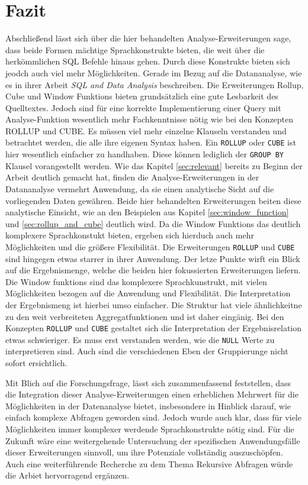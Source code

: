 \chapter{Fazit}
\label{chap:fazit} Abschließend lässt sich über die hier behandelten Analyse-Erweiterungen
sage, dass beide Formen mächtige Sprachkonstrukte bieten, die weit über die herkömmlichen
SQL Befehle hinaus gehen. Durch diese Konstrukte bieten sich jeodch auch viel
mehr Möglichkeiten. Gerade im Bezug auf die Datananalyse, wie es \citet{FOTACHE2015243}
in ihrer Arbeit \textit{SQL and Data Analysis} beschreiben. Die Erweiterungen Rollup,
Cube und Window Funktions bieten grundsätzlich eine gute Lesbarkeit des
Quelltextes. Jedoch sind für eine korrekte Implementierung einer Query mit Analyse-Funktion
wesentlich mehr Fachkenntnisse nötig wie bei den Konzepten ROLLUP und CUBE. Es
müssen viel mehr einzelne Klauseln verstanden und betrachtet werden, die alle ihre
eigenen Syntax haben. Ein \texttt{ROLLUP} oder \texttt{CUBE} ist hier wesentlich
einfacher zu handhaben. Diese können lediglich der \texttt{GROUP BY} Klausel
vorangestellt werden. Wie das Kapitel \ref{sec:relevant} bereits zu Beginn der Arbeit
deutlich gemacht hat, finden die Analyse-Erweiterungen in der Datananalyse
vermehrt Anwendung, da sie einen analytische Sicht auf die vorliegenden Daten gewähren.
Beide hier behandelten Erweiterungen beiten diese analytische Einsicht, wie an den
Beispielen aus Kapitel \ref{sec:window_function} und \ref{sec:rollup_and_cube} deutlich
wird. Da die Window Funktions das deutlich komplexere Sprachkonstukt bieten, ergeben
sich hierduch auch mehr Möglichkeiten und die größere Flexibilität. Die
Erweiterungen \texttt{ROLLUP} und \texttt{CUBE} sind hingegen etwas starrer in
ihrer Anwendung. Der letze Punkte wirft ein Blick auf die Ergebnismenge, welche
die beiden hier fokussierten Erweiterungen liefern. Die Window funktions sind das
komplexere Sprachkunstrukt, mit vielen Möglichkeiten bezogen auf die Anwendung
und Flexibilität. Die Interpretation der Ergebnismeng ist hierbei umso einfacher.
Die Struktur hat viele ähnlichkeitne zu den weit verbreiteten Aggregatfunktionen
und ist daher eingänig. Bei den Konzepten \texttt{ROLLUP} und \texttt{CUBE} gestaltet
sich die Interpretation der Ergebnisrelation etwas schwieriger. Es muss erst
verstanden werden, wie die \texttt{NULL} Werte zu interpretieren sind. Auch sind
die verschiedenen Eben der Gruppierunge nicht sofort ersichtlich.

Mit Blich auf die Forschungsfrage, lässt sich zusammenfassend feststellen, dass die
Integration dieser Analyse-Erweiterungen einen erheblichen Mehrwert für die Möglichkeiten
in der Datenanalyse bietet, insbesondere in Hinblick darauf, wie einfach komplexe
Abfragen geworden sind. Jedoch wurde auch klar, dass für viele Möglichkeiten immer
komplexer werdende Sprachkonstrukte nötig sind. Für die Zukunft wäre eine
weitergehende Untersuchung der spezifischen Anwendungsfälle dieser Erweiterungen
sinnvoll, um ihre Potenziale vollständig auszuschöpfen. Auch eine weiterführende
Recherche zu dem Thema Rekursive Abfragen würde die Arbiet hervorragend ergänzen.